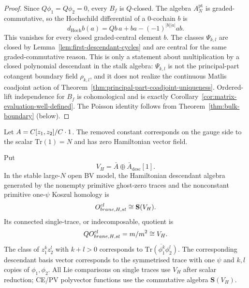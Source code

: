 \documentclass[11pt]{memoir}
\begin{document}
\begin{proof}
  Since $Q\phi_1=Q\phi_2=0$, every $B_f$ is $Q$-closed. The algebra
  $A_N^{\mathrm{pt}}$ is graded-commutative, so the Hochschild differential of
  a $0$-cochain $b$ is
  $$d_{\mathrm{Hoch}}b(a)=Qb\,a+
    ba-(-1)^{|b||a|}ab.$$
	  This vanishes for every closed graded-central element $b$. The classes
	  $\Psi_{k,l}$ are closed by Lemma~\ref{lem:first-descendant-cycles} and are
	  central for the same graded-commutative reason. This is only a statement
	  about multiplication by a closed polynomial descendant in the stalk algebra:
	  \(\Psi_{k,l}\) is not the principal-part cotangent boundary field
	  \(\rho_{k,l}\), and it does not realize the continuous Matlis coadjoint
	  action of Theorem~\ref{thm:principal-part-coadjoint-uniqueness}. Ordered-lift
	  independence for \(B_f\) is cohomological and is exactly
	  Corollary~\ref{cor:matrix-evaluation-well-defined}. The Poisson identity
	  follows from Theorem~\ref{thm:bulk-boundary} (below).
	\end{proof}

Let $A=C[z_1,z_2]/C\cdot1$. The removed constant corresponds on the
gauge side to the scalar $\mathrm{Tr}(1)=N$ and has zero Hamiltonian vector
field.

\begin{prop}\label{prop:brane-ops}
  Put
  \[
    V_H=\bar A\oplus\bar A_{\mathrm{desc}}[1].
  \]
  In the stable large-\(N\) open BV model, the Hamiltonian descendant algebra
  generated by the nonempty primitive ghost-zero traces and the nonconstant
  primitive one-\(\psi\) Koszul homology is
  \[
    O^{cl}_{brane,H,st}
      \cong \mathbf S(V_H).
  \]
  Its connected single-trace, or indecomposable, quotient is
  \[
    QO^{cl}_{brane,H,st}
      =m/m^2\cong V_H.
  \]
	  The class of $z_1^kz_2^l$ with $k+l>0$ corresponds to
	  $\overline{\mathrm{Tr}(\phi_1^k\phi_2^l)}$. The corresponding descendant
	  basis vector corresponds to the symmetrised trace with one $\psi$ and $k,l$
	  copies of $\phi_1,\phi_2$.  All Lie comparisons on single traces use \(V_H\)
	  after scalar reduction; CE/PV polyvector functions use the commutative
	  algebra \(\mathbf S(V_H)\).
\end{prop}
\end{document}
